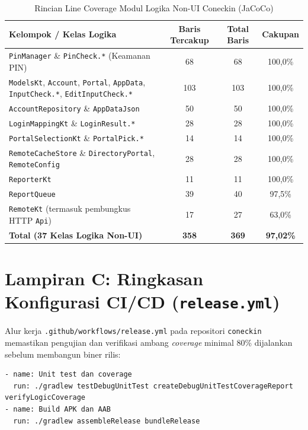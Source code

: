 \begin{table}[H]
\centering
\caption{Rincian Line Coverage Modul Logika Non-UI Coneckin (JaCoCo)}
\label{tab:jacoco-detail-lampiran}
\small
\begin{tabular}{@{}p{5.8cm}ccc@{}}
\toprule
\textbf{Kelompok / Kelas Logika} & \textbf{Baris Tercakup} & \textbf{Total Baris} & \textbf{Cakupan} \\
\midrule
\texttt{PinManager} \& \texttt{PinCheck.*} (Keamanan PIN) & 68 & 68 & 100,0\% \\
\texttt{ModelsKt}, \texttt{Account}, \texttt{Portal}, \texttt{AppData}, \texttt{InputCheck.*}, \texttt{EditInputCheck.*} & 103 & 103 & 100,0\% \\
\texttt{AccountRepository} \& \texttt{AppDataJson} & 50 & 50 & 100,0\% \\
\texttt{LoginMappingKt} \& \texttt{LoginResult.*} & 28 & 28 & 100,0\% \\
\texttt{PortalSelectionKt} \& \texttt{PortalPick.*} & 14 & 14 & 100,0\% \\
\texttt{RemoteCacheStore} \& \texttt{DirectoryPortal}, \texttt{RemoteConfig} & 28 & 28 & 100,0\% \\
\texttt{ReporterKt} & 11 & 11 & 100,0\% \\
\texttt{ReportQueue} & 39 & 40 & 97,5\% \\
\texttt{RemoteKt} (termasuk pembungkus HTTP \texttt{Api}) & 17 & 27 & 63,0\% \\
\midrule
\textbf{Total (37 Kelas Logika Non-UI)} & \textbf{358} & \textbf{369} & \textbf{97,02\%} \\
\bottomrule
\end{tabular}
\end{table}

\section*{Lampiran C: Ringkasan Konfigurasi CI/CD (\texttt{release.yml})}
Alur kerja \texttt{.github/workflows/release.yml} pada repositori \texttt{coneckin} memastikan pengujian dan verifikasi ambang \textit{coverage} minimal 80\% dijalankan sebelum membangun biner rilis:
\begin{lstlisting}
- name: Unit test dan coverage
  run: ./gradlew testDebugUnitTest createDebugUnitTestCoverageReport verifyLogicCoverage
- name: Build APK dan AAB
  run: ./gradlew assembleRelease bundleRelease
\end{lstlisting}
